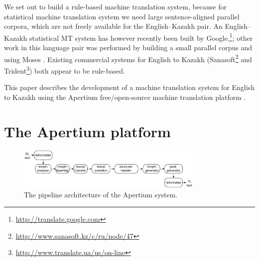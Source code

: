 \documentclass[11pt]{article}
\begin{document}
We set out to build a rule-based machine translation system, because for statistical machine translation 
system we need large sentence-aligned parallel corpora, which are not freely available
for the English--Kazakh pair. An English--Kazakh statistical MT system has however recently been built by Google,\footnote{\url{http://translate.google.com}}; 
other work in this language pair was performed by building a small parallel corpus and using Moses \citep{assylbekov14}. Existing 
commercial systems for English to Kazakh (Sanasoft\footnote{\url{http://www.sanasoft.kz/c/ru/node/47}} 
and Trident\footnote{\url{http://www.translate.ua/us/on-line}}) both appear to be rule-based. 

This paper describes the development of a machine translation system 
for English to Kazakh using the Apertium free/open-source machine 
translation platform \citep{forcada11}. %

\section{The Apertium platform}

\begin{figure}[htbp]
\begin{center}
 \includegraphics[width=0.8\textwidth]{architecture.pdf}
\end{center}
\caption{The pipeline architecture of the Apertium system.}
\label{fig:modules}
\vspace{-1em}
\end{figure}
\end{document}
